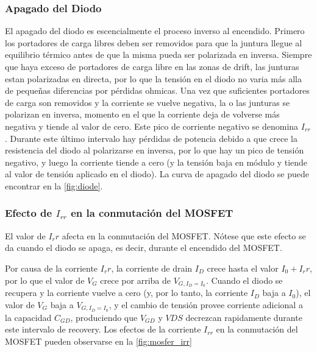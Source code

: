 \documentclass[e4_tp1_main.tex]{subfiles}
\begin{document}
\subsubsection{Apagado del Diodo}
El apagado del diodo es escencialmente el proceso inverso al encendido. Primero los portadores de carga libres deben ser removidos para que la juntura llegue al equilibrio térmico antes de que la misma pueda ser polarizada en inversa. Siempre que haya exceso de portadores de carga libre en las zonas de drift, las junturas estan polarizadas en directa, por lo que la tensión en el diodo no varia más alla de pequeñas diferencias por pérdidas ohmicas. Una vez que suficientes portadores de carga son removidos y la corriente se vuelve negativa, la o las junturas se polarizan en inversa, momento en el que la corriente deja de volverse más negativa y tiende al valor de cero. Este pico de corriente negativo se denomina $I_{rr}$. Durante este último intervalo hay pérdidas de potencia debido a que crece la resistencia del diodo al polarizarse en inversa, por lo que hay un pico de tensión negativo, y luego la corriente tiende a cero (y la tensión baja en módulo y tiende al valor de tensión aplicado en el diodo). La curva de apagado del diodo se puede encontrar en la \autoref{fig:diode}.

\subsubsection{Efecto de $I_{rr}$ en la conmutación del MOSFET}

El valor de $I_rr$ afecta en la conmutación del MOSFET. Nótese que este efecto se da cuando el diodo se apaga, es decir, durante el encendido del MOSFET.

Por causa de la corriente $I_rr$, la corriente de drain $I_D$ crece hasta el valor $I_0+I_rr$, por lo que el valor de $V_{G}$ crece por arriba de $V_{G,I_D=I_0}$. Cuando el diodo se recupera y la corriente vuelve a cero (y, por lo tanto, la corriente $I_D$ baja a $I_0$), el valor de $V_G$ baja a $V_{G,I_D=I_0}$, y el cambio de tensión provee corriente adicional a la capacidad $C_{GD}$, produciendo que $V_{GD}$ y $V{DS}$ decrezcan rapidamente durante este intervalo de recovery. Los efectos de la corriente $I_{rr}$ en la conmutación del MOSFET pueden observarse en la \autoref{fig:mosfer_irr}
\end{document}
